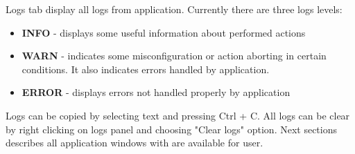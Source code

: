 Logs tab display all logs from application. 
Currently there are three logs levels:
\begin{itemize}
	\item \textbf{INFO} - displays some useful information about performed actions
	\item \textbf{WARN} - indicates some misconfiguration or action aborting in certain conditions. It also indicates errors handled by application.
	\item \textbf{ERROR} - displays errors not handled properly by application
\end{itemize}

Logs can be copied by selecting text and pressing Ctrl + C. All logs can be clear by right clicking on logs panel and choosing "Clear logs" option.
\newline\newline
Next sections describes all application windows with are available for user.

\vfill\newpage